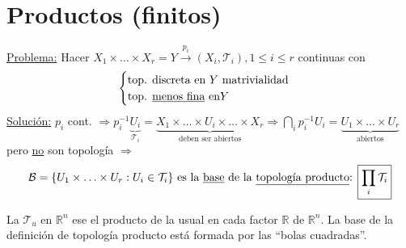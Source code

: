 \section{Productos (finitos)}%
\label{sec:productos_finitos_}
\underline{Problema:} Hacer $X_1 \times \ldots \times X_r = Y \xrightarrow{p_i} \left( X_i, \mathcal{T}_i \right), 1 \le i \le r$ continuas con 
\[
\begin{cases}
    \text{top. discreta en } Y \text{ matrivialidad}\\
    \text{top. \underline{menos fina} en} Y
\end{cases} 
\]
\underline{Solución:} $p_i$ cont. $\Rightarrow p_i^{-1} \underbrace{U_i}_{\mathcal{T}_i} = \underbrace{X_1 \times \ldots \times U_i \times \ldots \times X_r}_{\text{deben ser abiertos}}  \Rightarrow \bigcap_{i} p_i^{-1}U_i = \underbrace{U_1 \times \ldots \times U_r}_{\text{abiertos}}$ pero \underline{no} son topología $\Rightarrow$
\[
\mathcal{B} = \{U_1 \times \ldots \times U_r: U_i \in \mathcal{T}_i \} \text{ es la \underline{base} de la \underline{topología producto}: } \boxed{\prod_{i} \mathcal{T}_i} 
\]
\begin{ej}
La $\mathcal{T}_u$ en $\mathbb{R}^n$ ese el producto de la usual en cada factor $\mathbb{R}$ de $\mathbb{R}^n$. La base de la definición de topología producto está formada por las ``bolas cuadradas''.
\end{ej}

